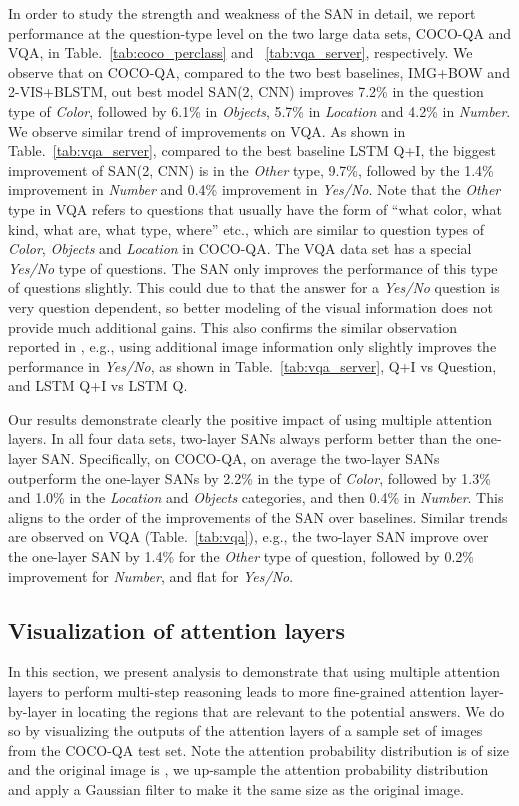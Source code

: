 \documentclass[10pt,twocolumn,letterpaper]{article}
\begin{document}
In order to study the strength and weakness of the SAN in detail, we report
performance at the question-type level on the two large data sets, COCO-QA and
VQA, in Table.~\ref{tab:coco_perclass} and ~\ref{tab:vqa_server},
respectively. We observe that on COCO-QA, compared to the two best baselines,
IMG+BOW and 2-VIS+BLSTM, out best model SAN(2, CNN) improves 7.2\% in the
question type of \emph{Color}, followed by 6.1\% in \emph{Objects}, 5.7\% in
\emph{Location} and 4.2\% in \emph{Number}. We observe similar trend of
improvements on VQA. As shown in Table.~\ref{tab:vqa_server}, compared to the
best baseline LSTM Q+I, the biggest improvement of SAN(2, CNN) is in the
\emph{Other} type, 9.7\%, followed by the 1.4\% improvement in \emph{Number}
and 0.4\% improvement in \emph{Yes/No}. Note that the \emph{Other} type in VQA
refers to questions that usually have the form of ``what color, what kind, what
are, what type, where'' etc., which are similar to question types of
\emph{Color}, \emph{Objects} and \emph{Location} in COCO-QA. The VQA data set
has a special \emph{Yes/No} type of questions. The SAN only improves the
performance of this type of questions slightly. This could due to that the
answer for a \emph{Yes/No} question is very question dependent, so better
modeling of the visual information does not provide much additional gains. This
also confirms the similar observation reported in \cite{antol2015vqa}, e.g.,
using additional image information only slightly improves the performance in
\emph{Yes/No}, as shown in Table.~\ref{tab:vqa_server}, Q+I vs Question, and
LSTM Q+I vs LSTM Q.

Our results demonstrate clearly the positive impact of using multiple attention
layers. In all four data sets, two-layer SANs always perform better than the
one-layer SAN. Specifically, on COCO-QA, on average the two-layer SANs
outperform the one-layer SANs by 2.2\% in the type of \emph{Color}, followed by
1.3\% and 1.0\% in the \emph{Location} and \emph{Objects} categories, and then
0.4\% in \emph{Number}. This aligns to the order of the improvements of the SAN
over baselines. Similar trends are observed on VQA (Table.~\ref{tab:vqa}),
e.g., the two-layer SAN improve over the one-layer SAN by 1.4\% for the
\emph{Other} type of question, followed by 0.2\% improvement for \emph{Number},
and flat for \emph{Yes/No}.


\subsection{Visualization of attention layers}
In this section, we present analysis to demonstrate that using multiple
attention layers to perform multi-step reasoning leads to more fine-grained
attention layer-by-layer in locating the regions that are relevant to the
potential answers. We do so by visualizing the outputs of the attention layers
of a sample set of images from the COCO-QA test set. Note the attention
probability distribution is of size  and the original image is
, we up-sample the attention probability distribution and apply a
Gaussian filter to make it the same size as the original image.
\end{document}
